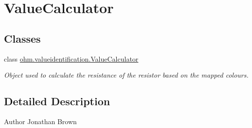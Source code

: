 \hypertarget{group___value_calculator}{}\section{Value\+Calculator}
\label{group___value_calculator}
\subsection*{Classes}
\begin{DoxyCompactItemize}
\item 
class \hyperlink{classohm_1_1valueidentification_1_1_value_calculator}{ohm.\+valueidentification.\+Value\+Calculator}
\begin{DoxyCompactList}\small\item\em Object used to calculate the resistance of the resistor based on the mapped colours. \end{DoxyCompactList}\end{DoxyCompactItemize}


\subsection{Detailed Description}
\begin{DoxyAuthor}{Author}
Jonathan Brown 
\end{DoxyAuthor}

